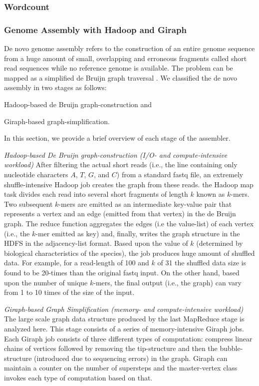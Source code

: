 \documentclass[journal]{IEEEtran}
\begin{document}
\subsubsection{Wordcount}
\subsubsection{Genome Assembly with Hadoop and Giraph}
De novo genome assembly refers to the construction of an entire genome sequence from a huge amount of small, overlapping and erroneous fragments called short read sequences while no reference genome is available. The problem can be mapped as a simplified de Bruijn graph traversal \cite{bio:debruijngraph}. We classified the de novo assembly in two stages as follows:
\begin{inparaenum}
\item Hadoop-based de Bruijn graph-construction and
\item Giraph-based graph-simplification.  
\end{inparaenum}
In this section, we provide a brief overview of each stage of the assembler. 

\textit{Hadoop-based De Bruijn graph-construction (I/O- and compute-intensive workload)}
After filtering the actual short reads (i.e., the line containing only nucleotide characters $A$, $T$, $G$, and $C$) from a standard fastq file, an extremely shuffle-intensive Hadoop job creates the graph from these reads.  the Hadoop map task divides each read into several short fragments of length $k$ known as $k$-mers. Two subsequent $k$-mers are emitted as an intermediate key-value pair that represents  a vertex and an edge (emitted from that vertex) in the de Bruijn graph.  The reduce function aggregates the edges (i.e the value-list) of each vertex (i.e., the $k$-mer emitted as key) and, finally, writes the graph structure in the HDFS in the adjacency-list format. Based upon the value of $k$ (determined by biological characteristics of the species), the job produces huge amount of shuffled data. For example, for a read-length of 100 and $k$ of 31 the shuffled data size is found to be 20-times than the original fastq input. On the other hand, based upon the number of unique $k$-mers, the final output (i.e., the graph) can vary from 1 to 10 times of the size of the input. 

\textit{Giraph-based Graph Simplification (memory- and compute-intensive workload)}
The large scale graph data structure produced by the last MapReduce stage is analyzed here. This stage consists of a series of memory-intensive Giraph jobs. Each Giraph job consists of three different types of computation: compress linear chains of vertices followed by removing the tip-structure and then the bubble-structure (introduced due to sequencing errors) in the graph. Giraph can maintain a counter on the number of supersteps and the master-vertex class invokes each type of computation based on that.
\end{document}
